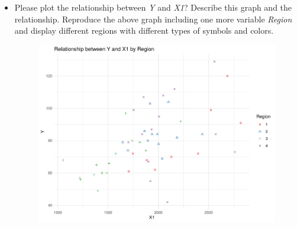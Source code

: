 \documentclass[12pt,letterpaper]{article}
\begin{document}
\begin{itemize}
		\vspace{.5cm}
		
		\item
		Please plot the relationship between \emph{Y} and \emph{X1}? Describe this graph and the relationship. Reproduce the above graph including one more variable \emph{Region} and display different regions with different types of symbols and colors.
		
		
		
		\begin{figure}
			\includegraphics[width=.85\textwidth]{plot_Y_X1_by_Region.pdf}
		\end{figure}
		
	\end{itemize}
	
	
\end{document}

